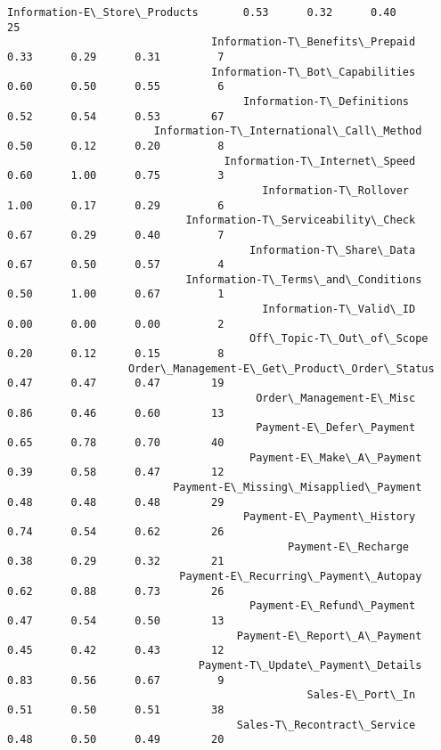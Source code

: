 \documentclass[11pt]{article}
\begin{document}
\begin{Verbatim}[commandchars=\\\{\}]
                                  Information-E\_Store\_Products       0.53      0.32      0.40        25
                                Information-T\_Benefits\_Prepaid       0.33      0.29      0.31         7
                                Information-T\_Bot\_Capabilities       0.60      0.50      0.55         6
                                     Information-T\_Definitions       0.52      0.54      0.53        67
                       Information-T\_International\_Call\_Method       0.50      0.12      0.20         8
                                  Information-T\_Internet\_Speed       0.60      1.00      0.75         3
                                        Information-T\_Rollover       1.00      0.17      0.29         6
                            Information-T\_Serviceability\_Check       0.67      0.29      0.40         7
                                      Information-T\_Share\_Data       0.67      0.50      0.57         4
                            Information-T\_Terms\_and\_Conditions       0.50      1.00      0.67         1
                                        Information-T\_Valid\_ID       0.00      0.00      0.00         2
                                      Off\_Topic-T\_Out\_of\_Scope       0.20      0.12      0.15         8
                   Order\_Management-E\_Get\_Product\_Order\_Status       0.47      0.47      0.47        19
                                       Order\_Management-E\_Misc       0.86      0.46      0.60        13
                                       Payment-E\_Defer\_Payment       0.65      0.78      0.70        40
                                      Payment-E\_Make\_A\_Payment       0.39      0.58      0.47        12
                          Payment-E\_Missing\_Misapplied\_Payment       0.48      0.48      0.48        29
                                     Payment-E\_Payment\_History       0.74      0.54      0.62        26
                                            Payment-E\_Recharge       0.38      0.29      0.32        21
                           Payment-E\_Recurring\_Payment\_Autopay       0.62      0.88      0.73        26
                                      Payment-E\_Refund\_Payment       0.47      0.54      0.50        13
                                    Payment-E\_Report\_A\_Payment       0.45      0.42      0.43        12
                              Payment-T\_Update\_Payment\_Details       0.83      0.56      0.67         9
                                               Sales-E\_Port\_In       0.51      0.50      0.51        38
                                    Sales-T\_Recontract\_Service       0.48      0.50      0.49        20

\end{Verbatim}
\end{document}
